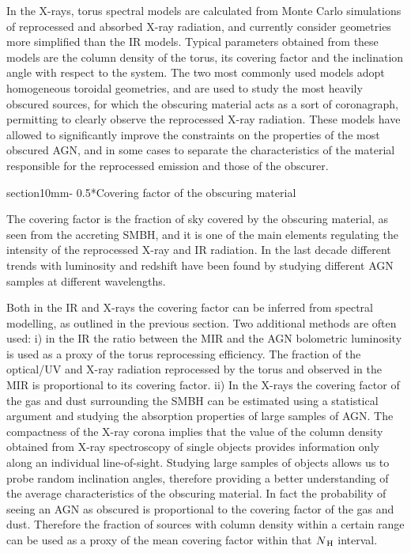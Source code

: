 \documentclass{natureprintstyle}
\makeatletter
\renewcommand{\section}{\@startsection%
{section}{1}{0mm}{-\baselineskip}%
{0.5\baselineskip}{\normalfont\Large\bfseries}}%
\makeatother
\begin{document}
In the X-rays, torus spectral models are calculated from Monte Carlo simulations of reprocessed and absorbed X-ray radiation\cite{Ikeda:2009hb,Murphy:2009hb,Brightman:2011fe,Liu:2014ff,Furui:2016qf}, and currently consider geometries more simplified than the IR models. Typical parameters obtained from these models are the column density of the torus, its covering factor and the inclination angle with respect to the system. {The two most commonly used models adopt homogeneous toroidal\cite{Murphy:2009hb,Brightman:2011fe} geometries,} and are used to study the most heavily obscured sources, for which the obscuring material acts as a sort of coronagraph, permitting to clearly observe the reprocessed X-ray radiation. These models have allowed to significantly improve the constraints on the properties of the most obscured AGN\cite{Balokovic:2014dq,Annuar:2015wd,Koss:2016fv}, and in some cases to separate the characteristics of the material responsible for the reprocessed emission and those of the obscurer\cite{Yaqoob:2012wu,Bauer:2015si}. 


\section*{Covering factor of the obscuring material}
\label{covering}

The covering factor is the fraction of sky covered by the obscuring material, as seen from the accreting SMBH, and it is one of the main elements regulating the intensity of the reprocessed X-ray and IR radiation. In the last decade different trends with luminosity and redshift have been found by studying different AGN samples at different wavelengths. 

Both in the IR and X-rays the covering factor can be inferred from spectral modelling, as outlined in the previous section. 
Two additional methods are often used: i) in the IR the ratio between the MIR and the AGN bolometric luminosity is used as a proxy of the {torus reprocessing efficiency. The fraction of the optical/UV and X-ray radiation reprocessed by the torus and observed 
in the MIR is proportional to its covering factor.} ii) In the X-rays the covering factor of the gas and dust surrounding the SMBH can be estimated using a statistical argument and studying the absorption properties of large samples of AGN. The compactness of the X-ray corona implies that the value of the column density obtained from X-ray spectroscopy of single objects provides information only along an individual line-of-sight. Studying large samples of objects {allows us to probe} random inclination angles, therefore providing a better understanding of the average characteristics of the obscuring material. In fact the probability of seeing an AGN as obscured is proportional to the covering factor of the gas and dust. Therefore the fraction of sources with column density within a certain range can be used as a proxy of the mean covering factor within that $N_{\rm\,H}$ interval. 
\end{document}

